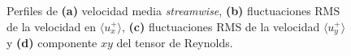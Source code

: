 \begin{figure}[H]
 \centering
    
 \caption{Perfiles de \textbf{(a)} velocidad media \textit{streamwise}, \textbf{(b)} fluctuaciones RMS de la velocidad en $\langle u^+_x \rangle$, \textbf{(c)} fluctuaciones RMS de la velocidad $\langle u^+_y \rangle$ y \textbf{(d)} componente $xy$ del tensor de Reynolds. } 
 \label{fig:kim_1}
\end{figure}


